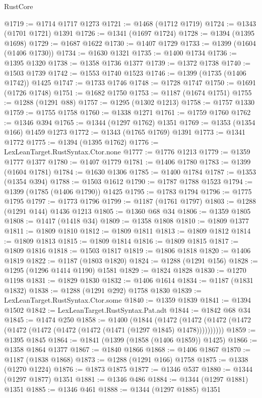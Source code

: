 \begin{lexlean}{RustCore}
\begin{coremodule}
@1719 := @1714 @1717 @1273
@1721 := @1468 (@1712 @1719)
@1724 := @1343 (@1701 @1721) @1391
@1726 := @1341 (@1697 @1724)
@1728 := @1394 (@1395 @1698)
@1729 := @1687 @1622
@1730 := @1407 @1729
@1733 := @1399 (@1604 (@1406 @1730))
@1734 := @1630 @1321
@1735 := @1400 @1734
@1736 := @1395 @1320
@1738 := @1358 @1736 @1377
@1739 := @1372 @1738
@1740 := @1503 @1739
@1742 := @1553 @1740 @1523
@1746 := @1399 (@1735 (@1406 @1742)) @1425
@1747 := @1733 @1746
@1748 := @1728 @1747
@1750 := @1691 (@1726 @1748)
@1751 := @1682 @1750
@1753 := @1187 (@1674 @1751)
@1755 := @1288 (@1291 @88)
@1757 := @1295 (@1302 @1213)
@1758 := @1757 @1330
@1759 := @1755 @1758
@1760 := @1338 @1271
@1761 := @1759 @1760
@1762 := @1346 @394
@1765 := @1344 (@1297 @1762) @1351
@1769 := @1353 (@1354 @166) @1459 @1273
@1772 := @1343 (@1765 @1769) @1391
@1773 := @1341 @1772
@1775 := @1394 (@1395 @1762)
@1776 := LexLeanTarget.RustSyntax.Ctor.none
@1777 := @1776 @1213
@1779 := @1359 @1777 @1377
@1780 := @1407 @1779
@1781 := @1406 @1780
@1783 := @1399 (@1604 @1781)
@1784 := @1630 @1306
@1785 := @1400 @1784
@1787 := @1353 (@1354 @394)
@1788 := @1503 @1612
@1790 := @1787 @1788 @1523
@1794 := @1399 (@1785 (@1406 @1790)) @1425
@1795 := @1783 @1794
@1796 := @1775 @1795
@1797 := @1773 @1796
@1799 := @1187 (@1761 @1797)
@1803 := @1288 (@1291 @144) @1436 @1213
@1805 := @1360 @68 @34
@1806 := @1359 @1805
@1808 := @1417 (@1418 @34)
@1809 := @1358 @1808
@1810 := @1809 @1377
@1811 := @1809 @1810
@1812 := @1809 @1811
@1813 := @1809 @1812
@1814 := @1809 @1813
@1815 := @1809 @1814
@1816 := @1809 @1815
@1817 := @1809 @1816
@1818 := @1503 @1817
@1819 := @1806 @1818
@1820 := @1406 @1819
@1822 := @1187 (@1803 @1820)
@1824 := @1288 (@1291 @156)
@1828 := @1295 (@1296 @1414 @1190) @1581
@1829 := @1824 @1828
@1830 := @1270 @1198
@1831 := @1829 @1830
@1832 := @1406 @1614
@1834 := @1187 (@1831 @1832)
@1838 := @1288 (@1291 @292) @1758 @1830
@1839 := LexLeanTarget.RustSyntax.Ctor.some
@1840 := @1359 @1839
@1841 := @1394 @1502
@1842 := LexLeanTarget.RustSyntax.Pat.adt
@1844 := @1842 @68 @34
@1845 := @1474 @250
@1858 := @1400
    (@1844
      (@1472 (@1472 (@1472 (@1472 (@1472 (@1472 (@1472 (@1472 (@1471 (@1297 @1845) @1478))))))))))
@1859 := @1395 @1845
@1864 := @1841 (@1399 (@1858 (@1406 @1859)) @1425)
@1866 := @1358 @1864 @1377
@1867 := @1840 @1866
@1868 := @1406 @1867
@1870 := @1187 (@1838 @1868)
@1873 := @1288 (@1291 @166) @1758
@1875 := @1338 (@1270 @1224)
@1876 := @1873 @1875
@1877 := @1346 @537
@1880 := @1344 (@1297 @1877) @1351
@1881 := @1346 @486
@1884 := @1344 (@1297 @1881) @1351
@1885 := @1346 @461
@1888 := @1344 (@1297 @1885) @1351

\end{coremodule}
\end{lexlean}
